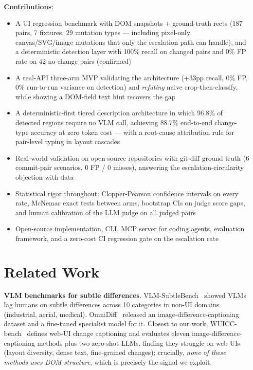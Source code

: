 \documentclass[10pt,twocolumn,letterpaper]{article}
\begin{document}
\textbf{Contributions}:
\begin{itemize}
\item A UI regression benchmark with DOM snapshots + ground-truth rects (187 pairs, 7 fixtures, 29 mutation types — including pixel-only canvas/SVG/image mutations that only the escalation path can handle), and a deterministic detection layer with 100\% recall on changed pairs and 0\% FP rate on 42 no-change pairs (confirmed)
\item A real-API three-arm MVP validating the architecture (+33pp recall, 0\% FP, 0\% run-to-run variance on detection) and \textit{refuting} naive crop-then-classify, while showing a DOM-field text hint recovers the gap
\item A deterministic-first tiered description architecture in which 96.8\% of detected regions require no VLM call, achieving 88.7\% end-to-end change-type accuracy at zero token cost — with a root-cause attribution rule for pair-level typing in layout cascades
\item Real-world validation on open-source repositories with git-diff ground truth (6 commit-pair scenarios, 0 FP / 0 misses), answering the escalation-circularity objection with data
\item Statistical rigor throughout: Clopper-Pearson confidence intervals on every rate, McNemar exact tests between arms, bootstrap CIs on judge score gaps, and human calibration of the LLM judge on all judged pairs
\item Open-source implementation, CLI, MCP server for coding agents, evaluation framework, and a zero-cost CI regression gate on the escalation rate
\end{itemize}

\section{Related Work}

\textbf{VLM benchmarks for subtle differences}. VLM-SubtleBench~\cite{vlmsubtlebench2026} showed VLMs lag humans on subtle differences across 10 categories in non-UI domains (industrial, aerial, medical). OmniDiff~\cite{omnidiff2026} released an image-difference-captioning dataset and a fine-tuned specialist model for it. Closest to our work, WUICC-bench~\cite{wuicc2026} defines web-UI change captioning and evaluates eleven image-difference-captioning methods plus two zero-shot LLMs, finding they struggle on web UIs (layout diversity, dense text, fine-grained changes); crucially, \textit{none of these methods uses DOM structure}, which is precisely the signal we exploit.
\end{document}
